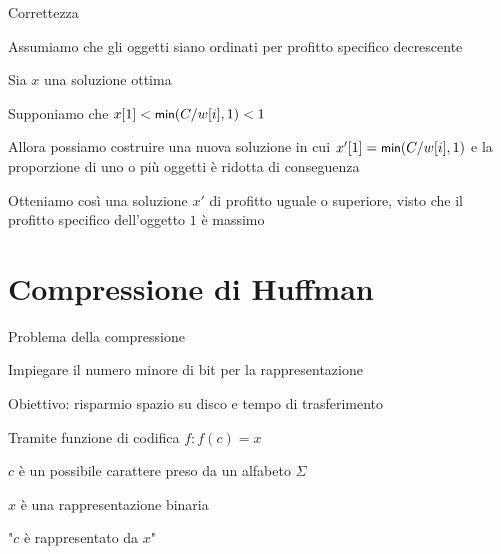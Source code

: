 \begin{frame}{Correttezza}


\BIL
\item Assumiamo che gli oggetti siano ordinati per profitto specifico decrescente
\item Sia $x$ una soluzione ottima
\item Supponiamo che $x[1] < \textsf{{\small min}}(C/w[i], 1) < 1$ 
\item Allora possiamo costruire una nuova soluzione in cui $x'[1] = \textsf{{\small min}}(C/w[i], 1)$ e 
la proporzione di uno o più oggetti è ridotta di conseguenza
\item Otteniamo così una soluzione $x'$ di profitto uguale o superiore, visto
che il profitto specifico dell'oggetto $1$ è massimo
\EIL

\end{frame}

\section{Compressione di Huffman}


\begin{frame}{Problema della compressione}

\BIL
\item Impiegare il numero minore di bit per la rappresentazione
\item Obiettivo: risparmio spazio su disco e tempo di trasferimento
\EIL

\bigskip
{}
\BIL
\item Tramite \alert{funzione di codifica} $f: f(c) = x$
\BI
	\item $c$ è un possibile carattere preso da un alfabeto $\Sigma$
	\item $x$ è una rappresentazione binaria
	\item "$c$ è rappresentato da $x$"
\EI
\EIL
\end{frame}

